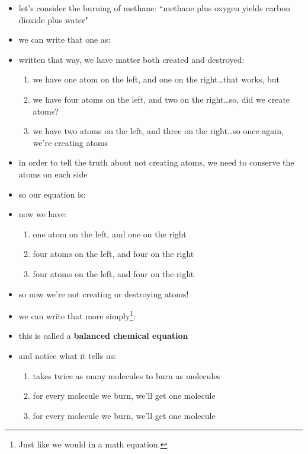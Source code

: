 \documentclass[11pt, oneside]{article}   	%
\begin{document}
\begin{itemize}
\item let's consider the burning of methane\cite[p. 117ff]{wile-chem-2}: ``methane plus oxygen yields carbon dioxide plus water"
\item we can write that one as:\\
\begin{center}
 \end{center}
\item written that way, we have matter both created and destroyed:
\begin{enumerate}
\item we have one  atom on the left, and one on the right\ldots that works, but
\item we have four  atoms on the left, and two on the right\ldots so, did we create atoms?
\item we have two  atoms on the left, and three on the right\ldots so once again, we're creating atoms
\end{enumerate}
\item in order to tell the truth about not creating atoms, we need to conserve the atoms on each side
\item so our equation is:\\  
\begin{center}
\end{center}
\item now we have:
\begin{enumerate}
\item one  atom on the left, and one on the right
\item four  atoms on the left, and four on the right
\item four  atoms on the left, and four on the right
\end{enumerate}
\item so now we're not creating or destroying atoms!
\item we can write that more simply\footnote{Just like we would in a math equation.}:\\
\begin{center}
 \end{center}
\item this is called a \textbf{balanced chemical equation}
\item and notice what it tells us:
\begin{enumerate}
\item {} takes twice as many  molecules to burn as  molecules 
\item for every  molecule we burn, we'll get one  molecule
\item for every  molecule we burn, we'll get one  molecule
\end{enumerate}
\end{itemize}





\nocite{wile-chem-2}
{}

\end{document}
